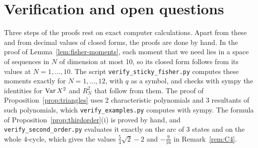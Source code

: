 \section{Verification and open questions}\label{sec:verify}

Three steps of the proofs rest on exact computer calculations. Apart from
these and from decimal values of closed forms, the proofs are done by hand.
In the proof of Lemma~\ref{lem:fisher-moments}, each moment that we need lies
in a space of sequences in $N$ of dimension at most 10, so its closed form
follows from its values at $N=1,\dots,10$. The script
\texttt{verify\_sticky\_fisher.py} computes these moments exactly for
$N=1,\dots,12$, with $q$ as a symbol, and checks with sympy the identities
for $\operatorname{Var} X^2$ and $R^2_N$ that follow from them. The proof of
Proposition~\ref{prop:triangles} uses 2 characteristic polynomials and 3
resultants of such polynomials, which \texttt{verify\_examples.py} computes
with sympy. The
formula of Proposition~\ref{prop:thirdorder}(i) is proved by hand, and
\texttt{verify\_second\_order.py} evaluates it exactly on the arc of 3 states
and on the whole 4-cycle, which gives the values $\frac54\sqrt2-2$ and
$-\frac9{16}$ in Remark~\ref{rem:C4}.

